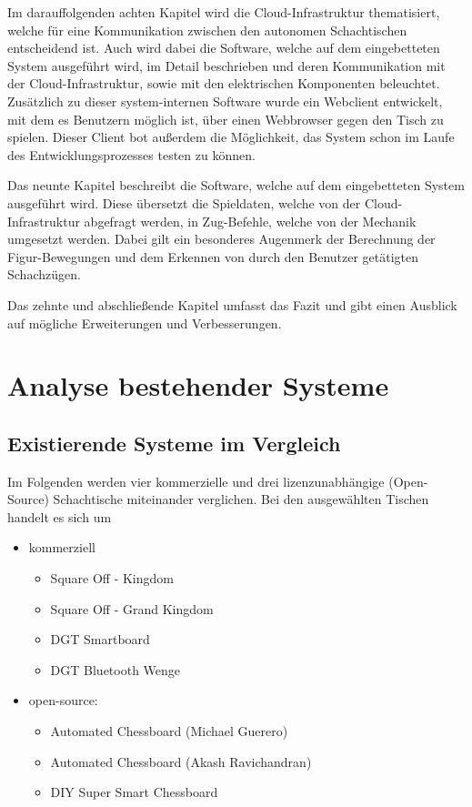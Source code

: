 Im darauffolgenden achten Kapitel wird die Cloud-Infrastruktur
thematisiert, welche für eine Kommunikation zwischen den autonomen
Schachtischen entscheidend ist. Auch wird dabei die Software, welche auf
dem eingebetteten System ausgeführt wird, im Detail beschrieben und
deren Kommunikation mit der Cloud-Infrastruktur, sowie mit den
elektrischen Komponenten beleuchtet. Zusätzlich zu dieser
system-internen Software wurde ein Webclient entwickelt, mit dem es
Benutzern möglich ist, über einen Webbrowser gegen den Tisch zu spielen.
Dieser Client bot außerdem die Möglichkeit, das System schon im Laufe
des Entwicklungsprozesses testen zu können.

Das neunte Kapitel beschreibt die Software, welche auf dem eingebetteten
System ausgeführt wird. Diese übersetzt die Spieldaten, welche von der
Cloud-Infrastruktur abgefragt werden, in Zug-Befehle, welche von der
Mechanik umgesetzt werden. Dabei gilt ein besonderes Augenmerk der
Berechnung der Figur-Bewegungen und dem Erkennen von durch den Benutzer
getätigten Schachzügen.

Das zehnte und abschließende Kapitel umfasst das Fazit und gibt einen
Ausblick auf mögliche Erweiterungen und Verbesserungen.

\hypertarget{analyse-bestehender-systeme}{%
\chapter{Analyse bestehender
Systeme}\label{analyse-bestehender-systeme}}

\hypertarget{existierende-systeme-im-vergleich}{%
\section{Existierende Systeme im
Vergleich}\label{existierende-systeme-im-vergleich}}

Im Folgenden werden vier kommerzielle und drei lizenzunabhängige
(Open-Source) Schachtische miteinander verglichen. Bei den ausgewählten
Tischen handelt es sich um

\begin{itemize}
\tightlist
\item
  kommerziell

  \begin{itemize}
  \tightlist
  \item
    Square Off - Kingdom
  \item
    Square Off - Grand Kingdom
  \item
    DGT Smartboard
  \item
    DGT Bluetooth Wenge
  \end{itemize}
\item
  open-source:

  \begin{itemize}
  \tightlist
  \item
    Automated Chessboard (Michael Guerero)
  \item
    Automated Chessboard (Akash Ravichandran)
  \item
    DIY Super Smart Chessboard
  \end{itemize}
\end{itemize}

